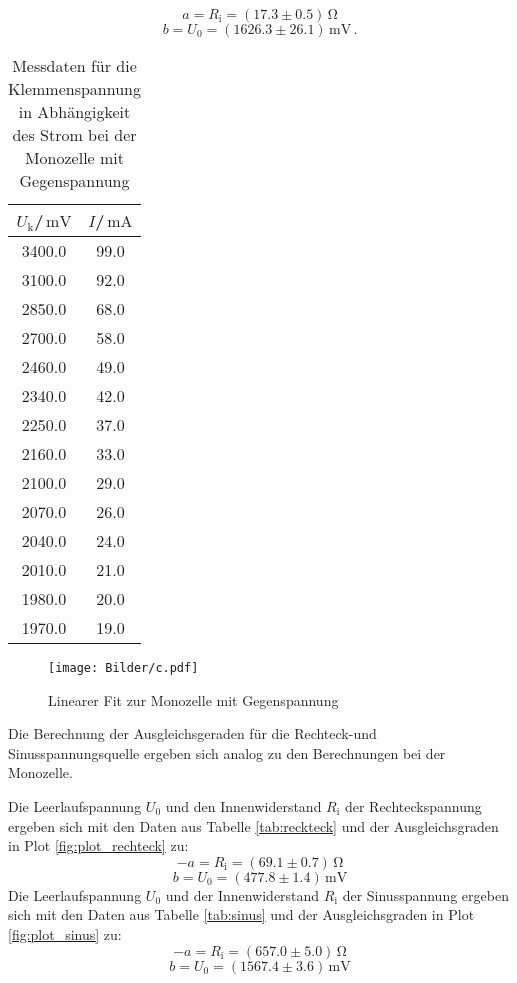 \begin{equation*}
  a= R_\text{i}=(17.3\pm 0.5)\,\si{\ohm}
\end{equation*}
\begin{equation*}
  b =U_\text{0}=(1626.3\pm 26.1)\,\si{\milli\volt}\,.
\end{equation*}
\begin{table}
  \centering
  \caption{Messdaten für die Klemmenspannung in Abhängigkeit des Strom bei der Monozelle mit Gegenspannung}
  \label{tab:monozelle_belastet}
\begin{tabular}{cc}
  \toprule
$U_\text{k}$/$\,\si{\milli\volt}$ & $I$/$\,\si{\milli\ampere}$\\
\midrule
3400.0 & 99.0 \\
3100.0 & 92.0 \\
2850.0 & 68.0 \\
2700.0 & 58.0 \\
2460.0 & 49.0 \\
2340.0 & 42.0 \\
2250.0 & 37.0 \\
2160.0 & 33.0 \\
2100.0 & 29.0 \\
2070.0 & 26.0 \\
2040.0 & 24.0 \\
2010.0 & 21.0 \\
1980.0 & 20.0 \\
1970.0 & 19.0 \\
\bottomrule
\end{tabular}
\end{table}
\begin{figure}
\texttt{[image: Bilder/c.pdf]}
\caption{Linearer Fit zur Monozelle mit Gegenspannung}
\label{fig:plot_monozellebelastet}
\end{figure}

Die Berechnung der Ausgleichsgeraden für die Rechteck-und Sinusspannungsquelle ergeben sich analog zu den Berechnungen bei der Monozelle.


Die Leerlaufspannung $U_\text{0}$ und den Innenwiderstand $R_\text{i}$ der Rechteckspannung ergeben sich mit den Daten aus Tabelle \ref{tab:reckteck} und der Ausgleichsgraden in Plot \ref{fig:plot_rechteck} zu:
\begin{equation*}
  -a= R_\text{i}=(69.1\pm0.7)\,\si{\ohm}
\end{equation*}
\begin{equation*}
  b =U_\text{0}=(477.8\pm1.4)\,\si{\milli\volt}
\end{equation*}
Die Leerlaufspannung $U_\text{0}$ und der Innenwiderstand $R_\text{i}$ der Sinusspannung ergeben sich mit den Daten aus Tabelle \ref{tab:sinus} und der Ausgleichsgraden in Plot \ref{fig:plot_sinus} zu:
\begin{equation*}
  -a= R_\text{i}=(657.0± 5.0)\,\si{\ohm}
\end{equation*}
\begin{equation*}
  b =U_\text{0}=(1567.4\pm3.6)\,\si{\milli\volt}
\end{equation*}

